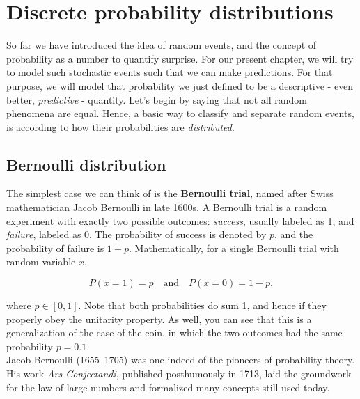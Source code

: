 \documentclass{book}
\begin{document}
\newpage

\section{Discrete probability distributions}

So far we have introduced the idea of random events, and the concept of probability as a number to quantify surprise. For our present chapter, we will try to model such stochastic events such that we can make predictions. For that purpose, we will model that probability we just defined to be a descriptive - even better, \textit{predictive} - quantity. Let's begin by saying that not all random phenomena are equal. Hence, a basic way to classify and separate random events, is according to how their probabilities are \textit{distributed}.
 
 \subsection{Bernoulli distribution}

The simplest case we can think of is the \textbf{Bernoulli trial}, named after Swiss mathematician Jacob Bernoulli in late 1600s. A Bernoulli trial is a random experiment with exactly two possible outcomes: \textit{success}, usually labeled as 1, and \textit{failure}, labeled as 0. The probability of success is denoted by $p$, and the probability of failure is $1 - p$.
Mathematically, for a single Bernoulli trial with random variable $x$,

\begin{equation}
P(x = 1) = p \quad \text{and} \quad P(x = 0) = 1 - p,
\end{equation}

where $p \in [0, 1]$. Note that both probabilities do sum 1, and hence if they properly obey the unitarity property. As well, you can see that this is a generalization of the case of the coin, in which the two outcomes had the same probability $p = 0.1$.\\

Jacob Bernoulli (1655–1705) was one indeed of the pioneers of probability theory. His work \textit{Ars Conjectandi}, published posthumously in 1713, laid the groundwork for the law of large numbers and formalized many concepts still used today.
\end{document}
